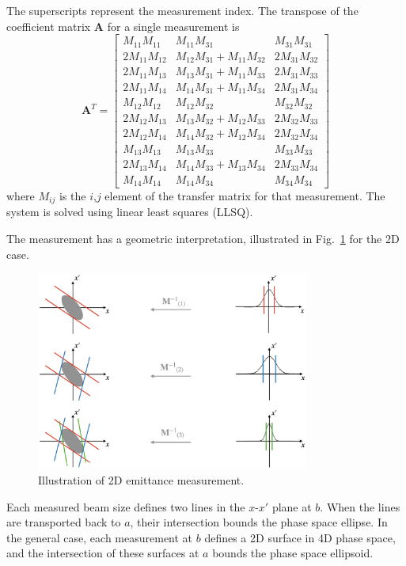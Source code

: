 %
The superscripts represent the measurement index. The transpose of the coefficient matrix $\mathbf{A}$ for a single measurement is
%
\begin{equation}
    \mathbf{A}^T = 
    \begin{bmatrix}
        M_{11}M_{11} & M_{11}M_{31} & M_{31}M_{31} \\
        2M_{11}M_{12} & M_{12}M_{31} + M_{11}M_{32} & 2M_{31}M_{32} \\
        2M_{11}M_{13} & M_{13}M_{31} + M_{11}M_{33} & 2M_{31}M_{33} \\
        2M_{11}M_{14} & M_{14}M_{31} + M_{11}M_{34} & 2M_{31}M_{34} \\
        M_{12}M_{12} & M_{12}M_{32} & M_{32}M_{32} \\
        2M_{12}M_{13} & M_{13}M_{32} + M_{12}M_{33} & 2M_{32}M_{33} \\
        2M_{12}M_{14} & M_{14}M_{32} + M_{12}M_{34} & 2M_{32}M_{34} \\
        M_{13}M_{13} & M_{13}M_{33} & M_{33}M_{33} \\
        2M_{13}M_{14} & M_{14}M_{33} + M_{13}M_{34} & 2M_{33}M_{34} \\
        M_{14}M_{14} & M_{14}M_{34} & M_{34}M_{34}
    \end{bmatrix}
\end{equation}
%
where $M_{ij}$ is the $i$,$j$ element of the transfer matrix for that measurement. The system is solved using linear least squares (LLSQ). 

The measurement has a geometric interpretation, illustrated in Fig.~\ref{fig:ws_emittance_measurement} for the 2D case. 
%
\begin{figure}[!p]
    \centering
    \includegraphics[width=0.8\textwidth]{Images/chapter4/ws_emittance_measurement.png}
    \caption{Illustration of 2D emittance measurement.}
    \label{fig:ws_emittance_measurement}
\end{figure}
%
Each measured beam size defines two lines in the $x$-$x'$ plane at $b$. When the lines are transported back to $a$, their intersection bounds the phase space ellipse. In the general case, each measurement at $b$ defines a 2D surface in 4D phase space, and the intersection of these surfaces at $a$ bounds the phase space ellipsoid.


